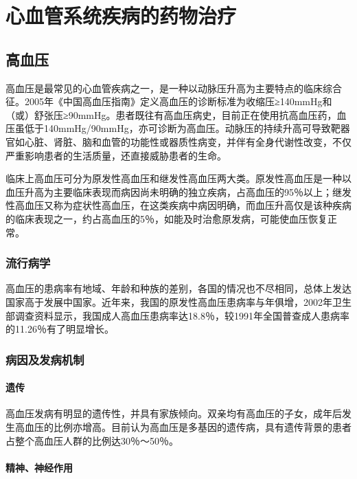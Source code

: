\chapter{心血管系统疾病的药物治疗}

\section{高血压}

高血压是最常见的心血管疾病之一，是一种以动脉压升高为主要特点的临床综合征。2005年《中国高血压指南》定义高血压的诊断标准为收缩压≥140mmHg和（或）舒张压≥90mmHg。患者既往有高血压病史，目前正在使用抗高血压药，血压虽低于140mmHg/90mmHg，亦可诊断为高血压。动脉压的持续升高可导致靶器官如心脏、肾脏、脑和血管的功能性或器质性病变，并伴有全身代谢性改变，不仅严重影响患者的生活质量，还直接威胁患者的生命。

临床上高血压可分为原发性高血压和继发性高血压两大类。原发性高血压是一种以血压升高为主要临床表现而病因尚未明确的独立疾病，占高血压的95％以上；继发性高血压又称为症状性高血压，在这类疾病中病因明确，而血压升高仅是该种疾病的临床表现之一，约占高血压的5％，如能及时治愈原发病，可能使血压恢复正常。

\subsection{流行病学}

高血压的患病率有地域、年龄和种族的差别，各国的情况也不尽相同，总体上发达国家高于发展中国家。近年来，我国的原发性高血压患病率与年俱增，2002年卫生部调查资料显示，我国成人高血压患病率达18.8％，较1991年全国普查成人患病率的11.26％有了明显增长。

\subsection{病因及发病机制}

\subsubsection{遗传}

高血压发病有明显的遗传性，并具有家族倾向。双亲均有高血压的子女，成年后发生高血压的比例亦增高。目前认为高血压是多基因的遗传病，具有遗传背景的患者占整个高血压人群的比例达30％～50％。

\subsubsection{精神、神经作用}

